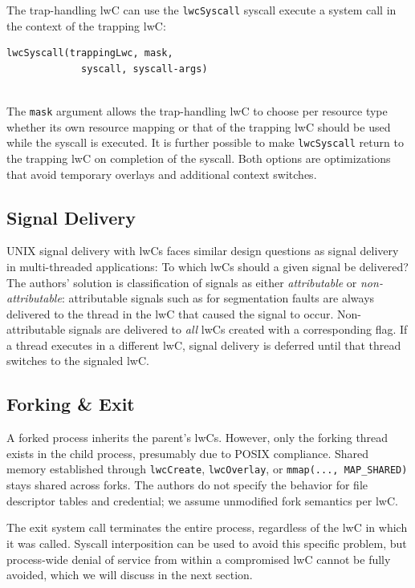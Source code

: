 \documentclass[10pt,twocolumn,a4paper]{article}
\begin{document}
The trap-handling lwC can use the \lstinline{lwcSyscall} syscall execute a system call in the context of the trapping lwC:
\begin{lstlisting}[style=syscallinline,float=h]
  lwcSyscall(trappingLwc, mask,
             syscall, syscall-args)
\end{lstlisting}\\
The \lstinline{mask} argument allows the trap-handling lwC to choose per resource type whether its own resource mapping or that of the trapping lwC should be used while the syscall is executed.
It is further possible to make \lstinline{lwcSyscall} return to the trapping lwC on completion of the syscall.
Both options are optimizations that avoid temporary overlays and additional context switches.
\cite{lwcpaper,lwckernelrepo}

\subsection{Signal Delivery}
UNIX signal delivery with lwCs faces similar design questions as signal delivery in multi-threaded applications: To which lwCs should a given signal be delivered?
The authors' solution is classification of signals as either \textit{attributable} or \textit{non-attributable}:
attributable signals such as for segmentation faults are always delivered to the thread in the lwC that caused the signal to occur.
Non-attributable signals are delivered to \textit{all} lwCs created with a corresponding flag.
If a thread executes in a different lwC, signal delivery is deferred until that thread switches to the signaled lwC.
\cite{lwcpaper}

\subsection{Forking \& Exit}
A forked process inherits the parent's lwCs.
However, only the forking thread exists in the child process, presumably due to POSIX compliance\cite{forkmultithread}. %
Shared memory established through \lstinline{lwcCreate}, \lstinline{lwcOverlay}, or \lstinline{mmap(..., MAP_SHARED)} stays shared across forks.
The authors do not specify the behavior for file descriptor tables and credential; we assume unmodified fork semantics per lwC.
\cite{lwcpaper}

The exit system call terminates the entire process, regardless of the lwC in which it was called.
Syscall interposition can be used to avoid this specific problem, but process-wide denial of service from within a compromised lwC cannot be fully avoided, which we will discuss in the next section.
\cite{lwcpaper}
\end{document}
